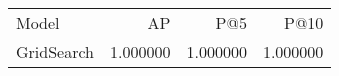 \begin{tabular}{lrrr}
Model & AP & P@5 & P@10 \\
GridSearch & 1.000000 & 1.000000 & 1.000000 \\
\end{tabular}
